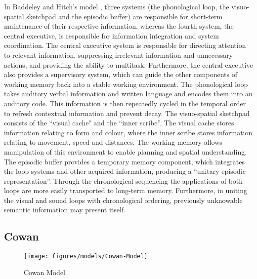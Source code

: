 In Baddeley and Hitch's model \cite{Work_Mem, Episodic_Buff}, three
systems (the phonological loop, the visuo-spatial sketchpad and the episodic
buffer) are responsible for short-term maintenance of their respective
information, whereas the fourth system, the central executive, is responsible
for information integration and system coordination.  The central executive
system is responsible for directing attention to relevant information,
suppressing irrelevant information and unnecessary actions, and providing the
ability to multitask. Furthermore, the central executive also provides a
supervisory system, which can guide the other components of working memory back
into a stable working environment. The phonological loop takes auditory verbal
information and written language and encodes them into an auditory code. This
information is then repeatedly cycled in the temporal order to refresh
contextual information and prevent decay. The visuo-spatial sketchpad consists
of the ``visual cache" and the ``inner scribe''.  The visual cache stores
information relating to form and colour, where the inner scribe stores
information relating to movement, speed and distances. The working memory allows
manipulation of this environment to enable planning and spatial understanding.
The episodic buffer provides a temporary memory component, which integrates the
loop systems and other acquired information, producing a ``unitary episodic
representation''\cite{Episodic_Buff}.  Through the chronological sequencing the
applications of both loops are more easily transported to long-term memory.
Furthermore, in uniting the visual and sound loops with chronological ordering,
previously unknowable semantic information may present itself.

\subsection{Cowan} 
\begin{figure}[htp]     
	\begin{center}
		\texttt{[image: figures/models/Cowan-Model]}
		\caption{Cowan Model}     
	\end{center}     
	\label{fig:COWAN_MODEL} 
\end{figure}

